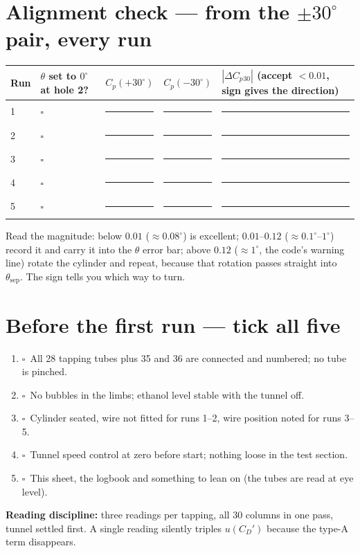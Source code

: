 \documentclass[10pt,a4paper]{article}
\newcommand{\blank}{\rule{1.55cm}{0.4pt}}
\newcommand{\checkbox}{\ensuremath{\square}}
\newcommand{\Cp}{\ensuremath{C_p}}
\newcommand{\thsep}{\ensuremath{\theta_{\text{sep}}}}
\newcommand{\CD}{\ensuremath{C_D}}
\begin{document}
\section*{Alignment check --- from the $\pm30^\circ$ pair, every run}
\begin{tabularx}{\textwidth}{@{}lXXXX@{}}
\toprule
Run & $\theta$ set to $0^\circ$ at hole 2? & $\Cp(+30^\circ)$ & $\Cp(-30^\circ)$ & $|\Delta\Cp{}_{30}|$ (accept $<0.01$, sign gives the direction) \\
\midrule
1 & \checkbox & \blank & \blank & \blank \\
2 & \checkbox & \blank & \blank & \blank \\
3 & \checkbox & \blank & \blank & \blank \\
4 & \checkbox & \blank & \blank & \blank \\
5 & \checkbox & \blank & \blank & \blank \\
\bottomrule
\end{tabularx}
{\small Read the magnitude: below $0.01$ ($\approx0.08^\circ$) is excellent; $0.01$--$0.12$
($\approx0.1^\circ$--$1^\circ$) record it and carry it into the $\theta$ error bar;
above $0.12$ ($\approx1^\circ$, the code's warning line) rotate the cylinder and repeat,
because that rotation passes straight into $\thsep$. The sign tells you which way to turn.}

\section*{Before the first run --- tick all five}
\begin{enumerate}[leftmargin=1.4em,itemsep=1pt,topsep=2pt]
\item \checkbox\ All 28 tapping tubes plus 35 and 36 are connected and numbered; no tube is pinched.
\item \checkbox\ No bubbles in the limbs; ethanol level stable with the tunnel off.
\item \checkbox\ Cylinder seated, wire not fitted for runs 1--2, wire position noted for runs 3--5.
\item \checkbox\ Tunnel speed control at zero before start; nothing loose in the test section.
\item \checkbox\ This sheet, the logbook and something to lean on (the tubes are read at eye level).
\end{enumerate}

{\small\textbf{Reading discipline:} three readings per tapping, all 30 columns in one pass, tunnel
settled first. A single reading silently triples $u(\CD')$ because the type-A term disappears.}
\end{document}
